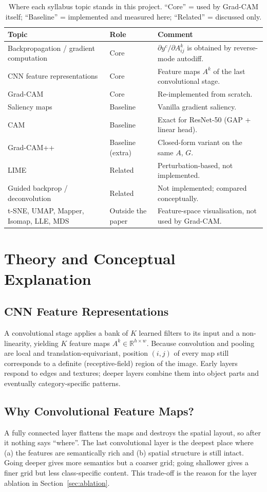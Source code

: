 \documentclass[11pt,a4paper]{article}
\newcommand{\GC}{Grad-CAM}
\begin{document}
\begin{table}[t]\centering
\caption{Where each syllabus topic stands in this project. ``Core'' = used by \GC{} itself; ``Baseline'' = implemented and measured here; ``Related'' = discussed only.}\label{tab:syllabus}
\small
\begin{tabular}{p{4.4cm}p{2.3cm}p{7.5cm}}
\toprule
Topic & Role & Comment \\ \midrule
Backpropagation / gradient computation & Core & $\partial y^c/\partial A^k_{ij}$ is obtained by reverse-mode autodiff. \\
CNN feature representations & Core & Feature maps $A^k$ of the last convolutional stage. \\
\GC{} & Core & Re-implemented from scratch. \\
Saliency maps & Baseline & Vanilla gradient saliency. \\
CAM & Baseline & Exact for ResNet-50 (GAP + linear head). \\
Grad-CAM++ & Baseline (extra) & Closed-form variant on the same $A$, $G$. \\
LIME & Related & Perturbation-based, not implemented. \\
Guided backprop / deconvolution & Related & Not implemented; compared conceptually. \\
t-SNE, UMAP, Mapper, Isomap, LLE, MDS & Outside the paper & Feature-space visualisation, not used by \GC. \\
\bottomrule
\end{tabular}
\end{table}

\section{Theory and Conceptual Explanation}\label{sec:theory}
\subsection{CNN Feature Representations}
A convolutional stage applies a bank of $K$ learned filters to its input and a non-linearity, yielding $K$ feature maps $A^k\in\mathbb{R}^{h\times w}$. Because convolution and pooling are local and translation-equivariant, position $(i,j)$ of every map still corresponds to a definite (receptive-field) region of the image.
Early layers respond to edges and textures; deeper layers combine them into object parts and eventually category-specific patterns.

\subsection{Why Convolutional Feature Maps?}
A fully connected layer flattens the maps and destroys the spatial layout, so after it nothing says ``where''. The last convolutional layer is the deepest place where (a) the features are semantically rich and (b) spatial structure is still intact. Going deeper gives more semantics but a coarser grid; going shallower gives a finer grid but less class-specific content. This trade-off is the reason for the layer ablation in Section~\ref{sec:ablation}.
\end{document}
